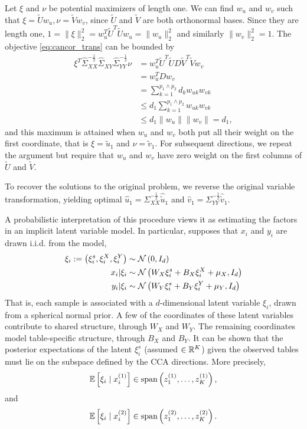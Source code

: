 \documentclass{article}
\begin{document}
Let $\xi$ and $\nu$ be potential maximizers of length one. We can find $w_{u}$
and $w_{v}$ such that $\xi = \tilde{U}w_{u}, \nu = \tilde{V}w_{v}$, since
$\tilde{U}$ and $\tilde{V}$ are both orthonormal bases. Since they are length
one, $1 = \|\xi\|^{2}_{2} = w_{u}^{T}\tilde{U}^{T}\tilde{U}w_{u} =
\|w_{u}\|_{2}^{2}$ and similarly $\|w_{v}\|_{2}^{2} = 1$. The objective
\ref{eq:cancor_trans} can be bounded by
\begin{align*}
\xi^{T}\hat{\Sigma}_{XX}^{-\frac{1}{2}}\hat{\Sigma}_{XY}\hat{\Sigma}_{YY}^{-\frac{1}{2}}\nu
&= w_{u}^{T}\tilde{U}^{T}\tilde{U}D\tilde{V}^{T}\tilde{V}w_{v} \\
&= w_{u}^{T}Dw_{v} \\
&= \sum_{k = 1}^{p_{1} \wedge p_{2}} d_{k}w_{uk}w_{vk} \\
&\leq d_{1} \sum_{k = 1}^{p_{1} \wedge p_{2}} w_{uk}w_{vk} \\
&\leq d_{1} \|w_{u}\|\|w_{v}\| = d_{1},
\end{align*}
and this maximum is attained when $w_{u}$ and $w_{v}$ both put all their weight
on the first coordinate, that is $\xi = \tilde{u}_{1}$ and $\nu =
\tilde{v}_{1}$. For subsequent directions, we repeat the argument but require
that $w_{u}$ and $w_{v}$ have zero weight on the first columns of $\tilde{U}$
and $\tilde{V}$.

To recover the solutions to the original problem, we reverse the original
variable transformation, yielding optimal $\hat{u}_{1} = 
\Sigma_{XX}^{-\frac{1}{2}}\hat{\tilde{u}}_{1}$ and $\hat{v}_{1} =
\Sigma_{YY}^{-\frac{1}{2}}\hat{\tilde{v}}_{1}$.

A probabilistic interpretation of this procedure views it as estimating the
factors in an implicit latent variable model. In particular,
\citep{bach2005probabilistic} supposes that $x_{i}$ and $y_{i}$ are drawn i.i.d.
from the model,
\begin{align*}
  \xi_{i} := \left(\xi_{i}^{s}, \xi_{i}^{X}, \xi_{i}^{Y}\right) &\sim
  \mathcal{N}\left(0, I_{d}\right) \\
  x_{i} \vert \xi_{i} &\sim \mathcal{N}\left(W_{X}\xi_{i}^{s} + B_{X}\xi_{i}^{X} + \mu_{X},
  I_{d} \right) \\
  y_{i} \vert \xi_{i} &\sim \mathcal{N}\left(W_{Y}\xi_{i}^{s} +
  B_{Y}\xi_{i}^{Y} + \mu_{Y}, I_{d}\right)
\end{align*}
That is, each sample is associated with a $d$-dimensional latent variable
$\xi_{i}$, drawn from a spherical normal prior. A few of the coordinates of
these latent variables contribute to shared structure, through $W_{X}$ and
$W_{Y}$. The remaining coordinates model table-specific structure, through
$B_{X}$ and $B_{Y}$. It can be shown that the posterior expectations of the
latent $\xi_{i}^{s}$ (assumed $\in \mathbb{R}^{K}$) given the observed tables must
lie on the subspace defined by the CCA directions. More precisely,
\begin{align*}
  \mathbb{E}\left[{\xi_{i} \mid x_{i}^{(1)}}\right] \in \text{span}\left(z_{1}^{(1)},
    \dots, z_{K}^{(1)}\right),
\end{align*}
and
\begin{align*}
  \mathbb{E}\left[{\xi_{i} \mid x_{i}^{(2)}}\right] \in \text{span}\left(z_{1}^{(2)},
    \dots, z_{K}^{(2)}\right).
\end{align*}
\end{document}
